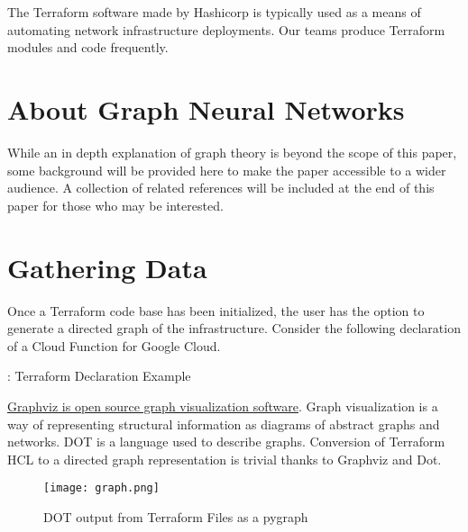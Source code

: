 



\vspace{2mm}

\vspace{2mm}
\section{\label{sec:Introduction}\mytitle}

\justifying
The Terraform software made by Hashicorp is typically used as a means of automating network infrastructure
deployments. Our teams produce Terraform modules and code frequently.

\section{\label{sec:Graph}About Graph Neural Networks}

\justifying
While an in depth explanation of graph theory is beyond the scope of this paper, some background
will be provided here to make the paper accessible to a wider audience. A collection of related references
will be included at the end of this paper for those who may be interested.

\section{\label{sec:collection}Gathering Data}

\justifying
Once a Terraform code base has been initialized, the user has the option to generate a directed graph of the infrastructure. Consider the following declaration of a Cloud Function for Google Cloud.

\begin{mybox}{\thetcbcounter: Terraform Declaration Example}
    
\end{mybox}


\justifying
\href{https://graphviz.org/}{Graphviz is open source graph visualization software}. Graph visualization is a way of representing
structural information as diagrams of abstract graphs and networks. DOT is a language used to describe graphs. Conversion of
Terraform HCL to a directed graph representation is trivial thanks to Graphviz and Dot.

\justifying
\begin{figure}[H]
	\texttt{[image: graph.png]}
	\caption{DOT output from Terraform Files as a pygraph}
	\label{pygraph}
\end{figure}


